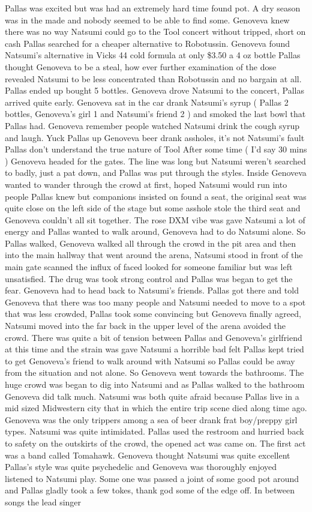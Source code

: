\documentclass[12pt]{book}
\begin{document}
Pallas was excited but was had an extremely hard time found pot. A dry season was in the made and nobody seemed to be able to find some. Genoveva knew there was no way Natsumi could go to the Tool concert without tripped, short on cash Pallas searched for a cheaper alternative to Robotussin. Genoveva found Natsumi's alternative in Vicks 44 cold formula at only \$3.50 a 4 oz bottle Pallas thought Genoveva to be a steal, how ever further examination of the dose revealed Natsumi to be less concentrated than Robotussin and no bargain at all. Pallas ended up bought 5 bottles. Genoveva drove Natsumi to the concert, Pallas arrived quite early. Genoveva sat in the car drank Natsumi's syrup ( Pallas 2 bottles, Genoveva's girl 1 and Natsumi's friend 2 ) and smoked the last bowl that Pallas had. Genoveva remember people watched Natsumi drink the cough syrup and laugh. Yuck Pallas up Genoveva beer drank assholes, it's not Natsumi's fault Pallas don't understand the true nature of Tool After some time ( I'd say 30 mins ) Genoveva headed for the gates. The line was long but Natsumi weren't searched to badly, just a pat down, and Pallas was put through the styles. Inside Genoveva wanted to wander through the crowd at first, hoped Natsumi would run into people Pallas knew but companions insisted on found a seat, the original seat was quite close on the left side of the stage but some asshole stole the third seat and Genoveva couldn't all sit together. The rose DXM vibe was gave Natsumi a lot of energy and Pallas wanted to walk around, Genoveva had to do Natsumi alone. So Pallas walked, Genoveva walked all through the crowd in the pit area and then into the main hallway that went around the arena, Natsumi stood in front of the main gate scanned the influx of faced looked for someone familiar but was left unsatisfied. The drug was took strong control and Pallas was began to get the fear. Genoveva had to head back to Natsumi's friends. Pallas got there and told Genoveva that there was too many people and Natsumi needed to move to a spot that was less crowded, Pallas took some convincing but Genoveva finally agreed, Natsumi moved into the far back in the upper level of the arena avoided the crowd. There was quite a bit of tension between Pallas and Genoveva's girlfriend at this time and the strain was gave Natsumi a horrible bad felt Pallas kept tried to get Genoveva's friend to walk around with Natsumi so Pallas could be away from the situation and not alone. So Genoveva went towards the bathrooms. The huge crowd was began to dig into Natsumi and as Pallas walked to the bathroom Genoveva did talk much. Natsumi was both quite afraid because Pallas live in a mid sized Midwestern city that in which the entire trip scene died along time ago. Genoveva was the only trippers among a sea of beer drank frat boy/preppy girl types. Natsumi was quite intimidated. Pallas used the restroom and hurried back to safety on the outskirts of the crowd, the opened act was came on. The first act was a band called Tomahawk. Genoveva thought Natsumi was quite excellent Pallas's style was quite psychedelic and Genoveva was thoroughly enjoyed listened to Natsumi play. Some one was passed a joint of some good pot around and Pallas gladly took a few tokes, thank god some of the edge off. In between songs the lead singer 
\end{document}

